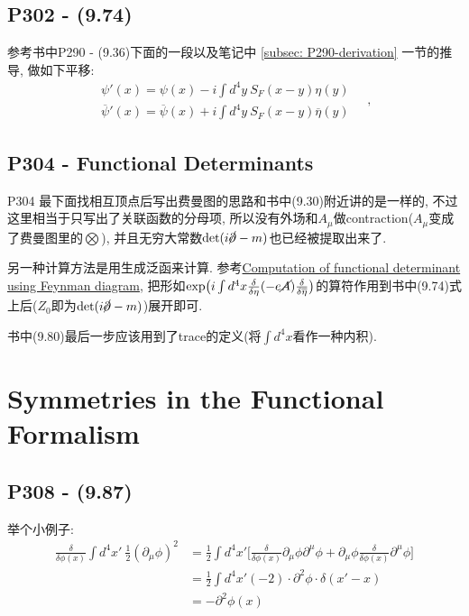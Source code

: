   \subsection{P302 - (9.74)}
  参考书中P290 - (9.36)下面的一段以及笔记中 \ref{subsec: P290-derivation} 一节的推导, 做如下平移:
  \begin{equation}
    \begin{gathered}
      \psi'(x) = \psi(x) - i\int d^4y\ S_F(x-y) \eta(y) \\
      \overline{\psi}'(x) = \overline{\psi}(x) + i\int d^4y\ S_F(x-y) \overline{\eta}(y)
    \end{gathered}\quad,
  \end{equation}

  \subsection{P304 - Functional Determinants}

  P304 最下面找相互顶点后写出费曼图的思路和书中(9.30)附近讲的是一样的, 不过这里相当于只写出了关联函数的分母项, 所以没有外场和$A_\mu$做contraction($A_\mu$变成了费曼图里的$\bigotimes$), 并且无穷大常数$\det(i\cancel{\partial}-m)$也已经被提取出来了.

  另一种计算方法是用生成泛函来计算.
  参考\href{https://physics.stackexchange.com/questions/699338/computation-of-functional-determinant-using-feynman-diagram}{Computation of functional determinant using Feynman diagram}, 把形如$\exp\bigl(i\int d^4x \frac{\delta}{\delta \eta}(-e\cancel{A})\frac{\delta}{\delta \overline{\eta}}\bigr)$的算符作用到书中(9.74)式上后($Z_0$即为$\det(i\cancel{\partial}-m)$)展开即可.

  书中(9.80)最后一步应该用到了trace的定义(将$\int d^4x$看作一种内积).

\section{Symmetries in the Functional Formalism}

\subsection{P308 - (9.87)}
举个小例子:
\begin{equation}
  \begin{aligned}
    \frac{\delta}{\delta \phi(x)}\int d^4x'\ \tfrac{1}{2} (\partial_\mu \phi)^2 & = \frac{1}{2} \int d^4x' \biggl[\frac{\delta}{\delta \phi(x)} \partial_\mu \phi \partial^\mu \phi + \partial_\mu \phi \frac{\delta}{\delta \phi(x)} \partial^\mu \phi\biggr] \\
                                                                                & = \frac{1}{2} \int d^4 x' (-2)\cdot \partial^2\phi \cdot \delta(x'-x)                                                                                                        \\
                                                                                & = -\partial^2\phi(x)
  \end{aligned}
\end{equation}

